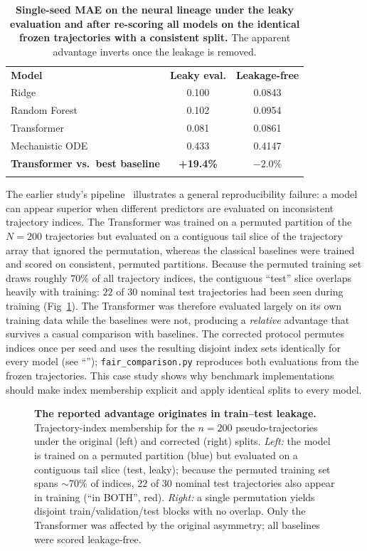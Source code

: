 \documentclass[10pt,letterpaper]{article}
\newlength\savedwidth
\newcommand\thickhline{\noalign{\global\savedwidth\arrayrulewidth\global\arrayrulewidth 2pt}%
\hline
\noalign{\global\arrayrulewidth\savedwidth}}
\begin{document}
\begin{table}[!ht]
\centering
\caption{\textbf{Single-seed MAE on the neural lineage under the leaky evaluation and after re-scoring all models on the identical frozen trajectories with a consistent split.} The apparent advantage inverts once the leakage is removed.}
\label{tab:leakage}
\begin{tabular}{lcc}
\thickhline
\textbf{Model} & \textbf{Leaky eval.} & \textbf{Leakage-free} \\
\thickhline
Ridge & 0.100 & 0.0843 \\
\hline
Random Forest & 0.102 & 0.0954 \\
\hline
Transformer & 0.081 & 0.0861 \\
\hline
Mechanistic ODE & 0.433 & 0.4147 \\
\hline
\textbf{Transformer vs.\ best baseline} & \textbf{+19.4\%} & \textbf{$-2.0\%$} \\
\thickhline
\end{tabular}
\end{table}

The earlier study's pipeline~\cite{kanu2026transformer} illustrates a general reproducibility failure: a model can appear superior when different predictors are evaluated on inconsistent trajectory indices. The Transformer was trained on a permuted partition of the $N=200$ trajectories but evaluated on a contiguous tail slice of the trajectory array that ignored the permutation, whereas the classical baselines were trained and scored on consistent, permuted partitions. Because the permuted training set draws roughly $70\%$ of all trajectory indices, the contiguous ``test'' slice overlaps heavily with training: $22$ of $30$ nominal test trajectories had been seen during training (Fig~\ref{fig:leakage}). The Transformer was therefore evaluated largely on its own training data while the baselines were not, producing a \emph{relative} advantage that survives a casual comparison with baselines. The corrected protocol permutes indices once per seed and uses the resulting disjoint index sets identically for every model (see ``''); \texttt{fair\_comparison.py} reproduces both evaluations from the frozen trajectories. This case study shows why benchmark implementations should make index membership explicit and apply identical splits to every model.

\begin{figure}[!h]
\caption{\textbf{The reported advantage originates in train--test leakage.} Trajectory-index membership for the $n=200$ pseudo-trajectories under the original (left) and corrected (right) splits. \emph{Left:} the model is trained on a permuted partition (blue) but evaluated on a contiguous tail slice (test, leaky); because the permuted training set spans $\sim$70\% of indices, $22$ of $30$ nominal test trajectories also appear in training (``in BOTH'', red). \emph{Right:} a single permutation yields disjoint train/validation/test blocks with no overlap. Only the Transformer was affected by the original asymmetry; all baselines were scored leakage-free.}
\label{fig:leakage}
\end{figure}
\end{document}
